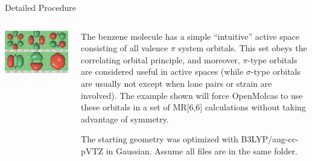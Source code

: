 \documentclass[12pt,aspectratio=169]{beamer}
\begin{document}
	\begin{frame}{Detailed Procedure}
		\begin{columns}
			\begin{column}{.5\linewidth}
				\includegraphics[width=\linewidth]{manual.png}
			\end{column}
			\begin{column}{.5\linewidth}
				\begin{footnotesize}
					
					
					The benzene molecule has a simple ``intuitive'' active space consisting of all valence $\pi$ system orbitals.  This set obeys the correlating orbital principle, and moreover, $\pi$-type orbitals are considered useful in active spaces (while $\sigma$-type orbitals are usually not except when lone pairs or strain are involved).  The example shown will force OpenMolcas to use these orbitals in a set of MR[6,6] calculations without taking advantage of symmetry.  
					
					The starting geometry was optimized with B3LYP/aug-cc-pVTZ in Gaussian.  Assume all files are in the same folder.
					
					
				\end{footnotesize}
			\end{column}
		\end{columns}
	\end{frame}
\end{document}
